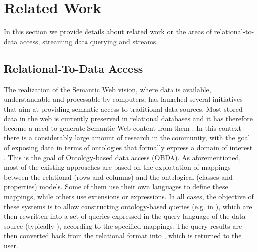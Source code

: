 \section{Related Work}
\label{sec:related-work}

In this section we provide details about related work on the areas of relational-to-\rdf data access, streaming data querying and \rdf streams.

\subsection{Relational-To-\rdf Data Access}
\label{sec:rdbtordf}
The realization of the Semantic Web vision, where data is available, understandable and processable by computers, has launched several initiatives that aim at providing semantic access to traditional data sources.
Most stored data in the web is currently preserved in relational databases and it has therefore become a need to generate Semantic Web content from them \cite{Sahoo_09}. In this context there is a considerably large amount of research in the community, with the goal of exposing data in terms of ontologies that formally express a domain of interest \cite{Poggi_08}. This is the goal of Ontology-based data access (OBDA).
%
As aforementioned, most of the existing approaches are based on the exploitation of mappings between the relational (rows and columns) and the ontological (classes and properties) models. Some of them use their own languages to define
these mappings, while others use \sparql extensions or \sql expressions.
In all cases, the objective of these systems is to allow constructing ontology-based queries (e.g. in \sparql), which
are then rewritten into a set of queries expressed in the query language of the data source (typically \sql), according
to the specified mappings. The query results are then converted back from the relational format into \rdf, which is returned to the user.

